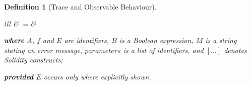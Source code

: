 \documentclass[manuscript,screen,review]{acmart}
\newtheorem{definition}{Definition}
\begin{document}
\begin{definition}[Trace and Observable Behaviour]
\begin{refactoring}[htb]
\begin{footnotesize}
\begin{tabular}{lll}
   & $=$&

\end{tabular}

\noindent \textbf{where} $A$, $f$ and $E$ are identifiers, $B$ is a Boolean expression, $M$ is a string stating an error message, $\mathit{parameters}$ is a list of identifiers, and $[\ldots]$ denotes Solidity constructs;

\noindent \textbf{provided} $E$ occurs only where explicitly shown.

\caption{Replace \texttt{require} with Custom Error.}
\label{rule:require}
\end{footnotesize}
\end{refactoring}


\end{definition}
\end{document}

